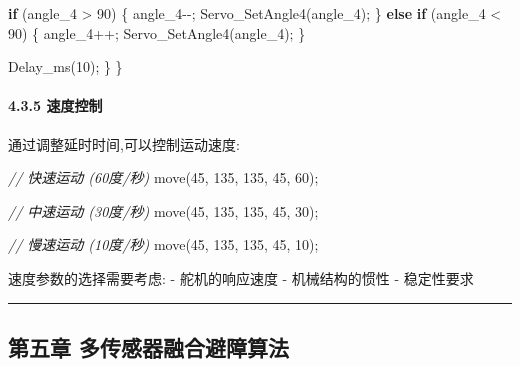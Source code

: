 \documentclass[
]{article}
\newenvironment{Shaded}{}{}
\newcommand{\CommentTok}[1]{\textcolor[rgb]{0.38,0.63,0.69}{\textit{#1}}}
\newcommand{\ControlFlowTok}[1]{\textcolor[rgb]{0.00,0.44,0.13}{\textbf{#1}}}
\newcommand{\DecValTok}[1]{\textcolor[rgb]{0.25,0.63,0.44}{#1}}
\newcommand{\NormalTok}[1]{#1}
\begin{document}
\begin{Shaded}
\begin{Highlighting}[]
        \ControlFlowTok{if}\NormalTok{ (angle\_4 \textgreater{} }\DecValTok{90}\NormalTok{) \{}
\NormalTok{            angle\_4{-}{-};}
\NormalTok{            Servo\_SetAngle4(angle\_4);}
\NormalTok{        \} }\ControlFlowTok{else} \ControlFlowTok{if}\NormalTok{ (angle\_4 \textless{} }\DecValTok{90}\NormalTok{) \{}
\NormalTok{            angle\_4++;}
\NormalTok{            Servo\_SetAngle4(angle\_4);}
\NormalTok{        \}}
        
\NormalTok{        Delay\_ms(}\DecValTok{10}\NormalTok{);}
\NormalTok{    \}}
\NormalTok{\}}
\end{Highlighting}
\end{Shaded}

\hypertarget{ux901fux5ea6ux63a7ux5236}{%
\paragraph{4.3.5 速度控制}\label{ux901fux5ea6ux63a7ux5236}}

通过调整延时时间,可以控制运动速度:

\begin{Shaded}
\begin{Highlighting}[]
\CommentTok{// 快速运动 (60度/秒)}
\NormalTok{move(}\DecValTok{45}\NormalTok{, }\DecValTok{135}\NormalTok{, }\DecValTok{135}\NormalTok{, }\DecValTok{45}\NormalTok{, }\DecValTok{60}\NormalTok{);}

\CommentTok{// 中速运动 (30度/秒)}
\NormalTok{move(}\DecValTok{45}\NormalTok{, }\DecValTok{135}\NormalTok{, }\DecValTok{135}\NormalTok{, }\DecValTok{45}\NormalTok{, }\DecValTok{30}\NormalTok{);}

\CommentTok{// 慢速运动 (10度/秒)}
\NormalTok{move(}\DecValTok{45}\NormalTok{, }\DecValTok{135}\NormalTok{, }\DecValTok{135}\NormalTok{, }\DecValTok{45}\NormalTok{, }\DecValTok{10}\NormalTok{);}
\end{Highlighting}
\end{Shaded}

速度参数的选择需要考虑: - 舵机的响应速度 - 机械结构的惯性 - 稳定性要求

\begin{center}\rule{0.5\linewidth}{0.5pt}\end{center}

\hypertarget{ux7b2cux4e94ux7ae0-ux591aux4f20ux611fux5668ux878dux5408ux907fux969cux7b97ux6cd5}{%
\subsection{第五章
多传感器融合避障算法}\label{ux7b2cux4e94ux7ae0-ux591aux4f20ux611fux5668ux878dux5408ux907fux969cux7b97ux6cd5}}
\end{document}
